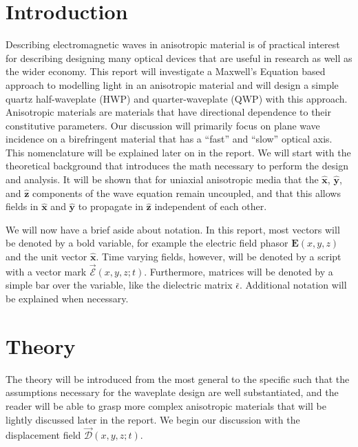 \documentclass{optica-article}
\newcommand{\bv}[1]{\mathbf{#1}}
\begin{document}
\section{Introduction}
Describing electromagnetic waves in anisotropic material is of practical
interest for describing designing many optical devices that are useful in 
research as well as the wider economy. This report will investigate a Maxwell's 
Equation based approach to modelling light in an anisotropic material and will
design a simple quartz half-waveplate (HWP) and quarter-waveplate (QWP) with 
this approach. Anisotropic materials are materials that have directional 
dependence to their constitutive parameters. Our discussion will primarily
focus on plane wave incidence on a birefringent material that has a ``fast'' 
and ``slow'' optical axis.
This nomenclature will be explained later on in the report.
We will start with the theoretical background that introduces the math necessary
to perform the design and analysis. It will be shown that for uniaxial
anisotropic media that the $\bv{\hat{x}}$,  $\bv{\hat{y}}$, and $\bv{\hat{z}}$ 
components of the wave equation remain uncoupled, and that this allows fields in 
$\bv{\hat{x}}$ and $\bv{\hat{y}}$ to propagate in $\bv{\hat{z}}$ independent 
of each other.

We will now have a brief aside about notation. In this report, most vectors will
be denoted by a bold variable, for example the electric field phasor 
$\bv{E}(x,y,z)$ and the unit vector $\bv{\hat{x}}$. Time varying fields, 
however, will be denoted by a script with a vector mark 
$\vec{\mathscr{E}}(x,y,z; t)$. Furthermore, matrices will be denoted by a
simple bar over the variable, like the dielectric matrix $\bar{\epsilon}$. 
Additional notation will be explained when necessary.


\section{Theory}
The theory will be introduced from the most general to 
the specific such that the assumptions necessary for the waveplate design are
well substantiated, and the reader will be able to grasp more complex anisotropic
materials that will be lightly discussed later in the report. We begin our 
discussion with the displacement field $\vec{\mathscr{D}}(x,y,z; t)$.
\end{document}
